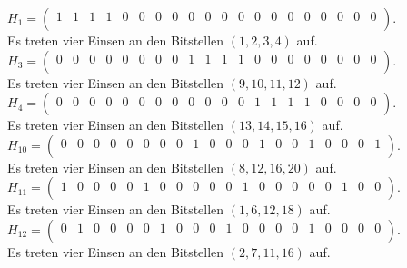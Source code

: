 \begin{Beispiel}
    $H_1= \left( \begin{array}{rrrrrrrrrrrrrrrrrrrr}
        1 & 1 & 1 & 1 & 0 & 0 & 0 & 0 & 0 & 0 & 0 & 0 & 0 & 0 & 0 & 0 & 0 & 0 & 0 & 0 \\
       \end{array}\right). 
    $\\
    Es treten vier Einsen an den Bitstellen $(1, 2, 3, 4)$ auf.\\
    
    $H_3= \left( \begin{array}{rrrrrrrrrrrrrrrrrrrr}
        0 & 0 & 0 & 0 & 0 & 0 & 0 & 0 & 1 & 1 & 1 & 1 & 0 & 0 & 0 & 0 & 0 & 0 & 0 & 0 \\
       \end{array}\right). 
    $\\
    Es treten vier Einsen an den Bitstellen $(9, 10, 11, 12)$ auf.\\
    
    $H_4= \left( \begin{array}{rrrrrrrrrrrrrrrrrrrr}
        0 & 0 & 0 & 0 & 0 & 0 & 0 & 0 & 0 & 0 & 0 & 0 & 1 & 1 & 1 & 1 & 0 & 0 & 0 & 0 \\
       \end{array}\right). 
    $\\
    Es treten vier Einsen an den Bitstellen $(13, 14, 15, 16)$ auf.\\
    
    $H_{10}=\left( \begin{array}{rrrrrrrrrrrrrrrrrrrr}
        0 & 0 & 0 & 0 & 0 & 0 & 0 & 0 & 1 & 0 & 0 & 0 & 1 & 0 & 0 & 1 & 0 & 0 & 0 & 1 \\
       \end{array}\right). 
    $\\
    Es treten vier Einsen an den Bitstellen $(8, 12, 16, 20)$ auf.\\
    
    $H_{11}= \left( \begin{array}{rrrrrrrrrrrrrrrrrrrr}
        1 & 0 & 0 & 0 & 0 & 1 & 0 & 0 & 0 & 0 & 0 & 1 & 0 & 0 & 0 & 0 & 0 & 1 & 0 & 0 \\
       \end{array}\right). 
    $\\
    Es treten vier Einsen an den Bitstellen $(1, 6, 12, 18)$ auf.\\
    
    $H_{12}= \left( \begin{array}{rrrrrrrrrrrrrrrrrrrr}
        0 & 1 & 0 & 0 & 0 & 0 & 1 & 0 & 0 & 0 & 1 & 0 & 0 & 0 & 0 & 1 & 0 & 0 & 0 & 0 \\
       \end{array}\right). 
    $\\
    Es treten vier Einsen an den Bitstellen $(2, 7, 11, 16)$ auf.\\
    

\end{Beispiel}
